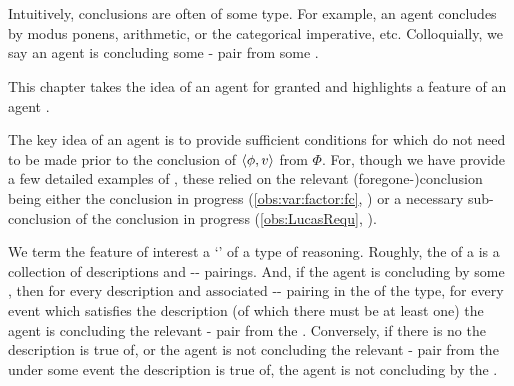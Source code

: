 \chapter{}
\label{cha:typical}
\label{idea:tC}

\nocite{Wilson:1994aa}
\nocite{Goodman:1983aa}

\begin{note}
  Intuitively, conclusions are often of some type.
  For example, an agent concludes by modus ponens, arithmetic, or the categorical imperative, etc.
  Colloquially, we say an agent is \emph{\typeAdj{}} concluding some - pair from some \pool{}.

  This chapter takes the idea of an agent \tCV{} for granted and highlights a feature of an agent \tCV{}.

  The key idea of an agent \tCV{} is to provide sufficient conditions for  which do not need to be made prior to the \agents{} conclusion of \(\langle\phi, v\rangle\) from \(\Phi\).
  For, though we have provide a few detailed examples of , these relied on the relevant (foregone-)conclusion being either the conclusion in progress (\autoref{obs:var:factor:fc}, ) or a necessary sub-conclusion of the conclusion in progress (\autoref{obs:LucasRequ}, ).
\end{note}


\begin{note}
  We term the feature of interest a `\tpro{}' of a type of reasoning.
  Roughly, the \tpro{} of a \torN{} is a collection of descriptions and -- pairings.
  And, if the agent is concluding by some \torNa{}, then for every description and associated -- pairing in the \tpro{} of the type, for every event which satisfies the description (of which there must be at least one) the agent is concluding the relevant - pair from the .
  Conversely, if there is no \eiw{} the description is true of, or the agent is not concluding the relevant - pair from the  under some event the description is true of, the agent is not concluding by the \torNa{}.
\end{note}


